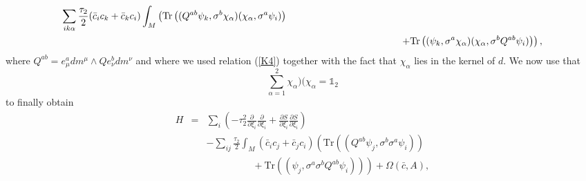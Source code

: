 \documentclass[letterpaper,11pt]{article}
\newcommand{\nn}{\nonumber}
\def\a{\alpha}
\def\m{\mu}
\def\n{\nu}
\def\OO{\Omega}
\newcommand{\pa}{\partial}
\begin{document}
\begin{eqnarray}
\sum_{ik\a} \frac{\tau_2}{2}  ( \bar{c}_i   {c}_{k} +  \bar{c}_k  {c}_{i} )
 \int_M \left( 
  \mbox{Tr} \left(            (Q^{ab}\psi_k,  \sigma^b \chi_\a)     (\chi_\a, \sigma^a \psi_i)  \right) 
\right.\nn\\&&\left.
\hspace{3,8cm}+  \mbox{Tr} \left(         (\psi_k,  \sigma^a \chi_\a)   (\chi_\a, \sigma^b Q ^{ab} \psi_i)   \right)
 \right) ,
\label{startrek}
\end{eqnarray}
where $Q^{ab}= e^a_\m  dm^\m \wedge  Q   e^b_\n dm^\n$ and
where we used relation (\ref{K4}) together with the fact that $\chi_\a$ lies in the kernel of $d$. We now use that
\begin{equation}
\sum_{\a=1}^2 \chi_\a )( \chi_\a = \mathds{1}_2
\label{coronaxxx}
\end{equation}
to finally obtain 
\begin{eqnarray}
H &=&  \sum_{i}    \left(  -\tau_2^2     \frac{\pa}{\pa\xi_{i }}  \frac{\pa}{\pa\xi_{i }}    
+  \frac{\pa S}{\pa \xi_i}\frac{\pa S}{\pa \xi_i}  \right)
\nn\\&&
- \sum_{ij} \frac{\tau_2}{2}      \int_M \left( \bar{c}_i   {c}_{j} + \bar{c}_j   {c}_{i}  \right)  
\left( \mbox{Tr} \left(    (Q^{ab}\psi_j,  \sigma^b \sigma^a \psi_i)  \right) 
\right. \nn\\ &&\left.\hspace{2cm}
+  \mbox{Tr} \left(     (\psi_j,  \sigma^a  \sigma^b Q ^{ab} \psi_i)   \right) \right)
+  \OO(\bar{c}, A),
\label{b222}
\end{eqnarray}
\end{document}
